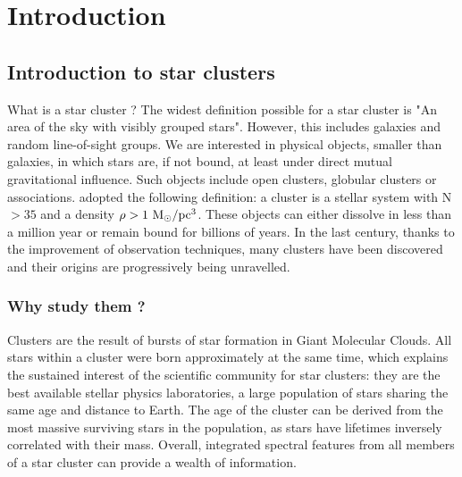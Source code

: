 
\chapter{Introduction}

\newpage

\section{Introduction to star clusters}


 What is a star cluster ? The widest definition possible for a star cluster is "An area of the sky with visibly grouped stars". However, this includes galaxies and random line-of-sight groups. We are interested in physical objects, smaller than galaxies, in which stars are, if not bound, at least under direct mutual gravitational influence. Such objects include open clusters, globular clusters or associations.  \cite{Lada2003} adopted the following definition: a cluster is a stellar system with N$>35$ and a density $\rho > 1~{\textrm{M}_\odot} /\textrm{pc}^3$. These objects can either dissolve in less than a million year or remain bound for billions of years. In the last century, thanks to the improvement of observation techniques, many  clusters have been discovered and their origins are progressively being unravelled.


\subsection{Why study them ?}

Clusters are the result of bursts of star formation in Giant Molecular Clouds. All stars within a cluster were born approximately at the same time, which explains the sustained interest of the scientific community for star clusters: they are the best available stellar physics laboratories, a large population of stars sharing the same age and distance to Earth. The age of the cluster can be derived from the most massive surviving stars in the population, as stars have lifetimes inversely correlated with their mass. Overall, integrated spectral features from all members of a star cluster can provide a wealth of information.


